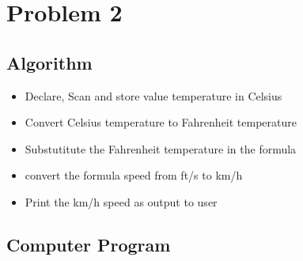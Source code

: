 




		
\section{{Problem 2}}

		\subsection{{Algorithm}}	
	
		\begin{itemize}
			\item {Declare, Scan and store value temperature in Celsius}
			\item {Convert Celsius temperature to Fahrenheit temperature}
			\item {Substutitute the Fahrenheit temperature in the formula}
			\item {convert the formula speed from ft/s to km/h}
			\item {Print the km/h speed as output to user}
		\end{itemize}
	
		\subsection{{Computer Program}}
	
